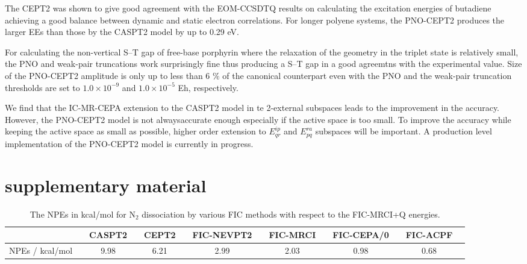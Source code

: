 \documentclass[aip,jcp,amsmath]{revtex4-1}
\begin{document}
%
The CEPT2 was shown to give good agreement with the EOM-CCSDTQ results on calculating the excitation energies of butadiene achieving a good balance between dynamic and static electron correlations.
%
For longer polyene systems, the PNO-CEPT2 produces the larger EEs than those by the CASPT2 model by up to 0.29 eV.

%
For calculating the non-vertical S--T gap of free-base porphyrin where the relaxation of the geometry in the triplet state is relatively small, the PNO and weak-pair truncations work surprisingly fine thus producing a S--T gap in a good agreemtns with the experimental value.
%
Size of the PNO-CEPT2 amplitude is only up to less than 6 $\%$ of the canonical counterpart even with the PNO and the weak-pair truncation thresholds are set to $1.0\times10^{-9}$ and $1.0\times 10^{-5}$ Eh, respectively.

%
We find that the IC-MR-CEPA extension to the CASPT2 model in te 2-external subspaces leads to the improvement in the accuracy.
%
However, the PNO-CEPT2 model is not alwaysaccurate enough especially if the active space is too small.
%
To improve the accuracy while keeping the active space as small as possible, higher order extension to $E^{ip}_{qr}$ and $E^{ra}_{pq}$ subspaces will be important.
%
A production level implementation of the PNO-CEPT2 model is currently in progress.

\section*{supplementary material}

\begin{acknowledgments}  
  
\end{acknowledgments}




\clearpage

{
  \begin{longtable}[!ht]{cccccccccccccc}
  \caption{\label{tab:dissociationN2-NPE}
    The NPEs in kcal/mol for N${}_2$ dissociation by various FIC methods with respect to the FIC-MRCI+Q energies.
  }
\\
\hline
\hline
{}               && CASPT2 && CEPT2 && FIC-NEVPT2 && FIC-MRCI && FIC-CEPA/0 && FIC-ACPF \\
\hline
NPEs  / kcal/mol &&   9.98 &&  6.21 &&       2.99 &&     2.03 &&       0.98 && 0.68 \\
\hline
\hline
\end{longtable}
}
\end{document}
